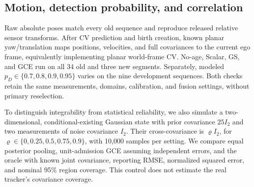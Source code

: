 \subsection{Motion, detection probability, and correlation}
Raw absolute poses match every old sequence and reproduce released
relative sensor transforms. After CV prediction and birth creation,
known planar yaw/translation maps positions, velocities, and full
covariances to the current ego frame, equivalently implementing planar
world-frame CV. No-age, Scalar, GS, and GCE run on all 34 old and three
new segments. Separately, modeled $p_D\in\{0.7,0.8,0.9,0.95\}$ varies on
the nine development sequences. Both checks retain the same measurements,
domains, calibration, and fusion settings, without primary reselection.

To distinguish integrability from statistical reliability, we also
simulate a two-dimensional, conditional-existing Gaussian state with
prior covariance $25I_2$ and two measurements of noise covariance $I_2$.
Their cross-covariance is $\varrho I_2$, for
$\varrho\in\{0,0.25,0.5,0.75,0.9\}$, with 10,000 samples per setting.
We compare equal posterior pooling, unit-admission GCE assuming
independent errors, and the oracle with known joint covariance, reporting
RMSE, normalized squared error, and nominal 95\% region coverage.
This control does not estimate the real tracker's covariance coverage.
